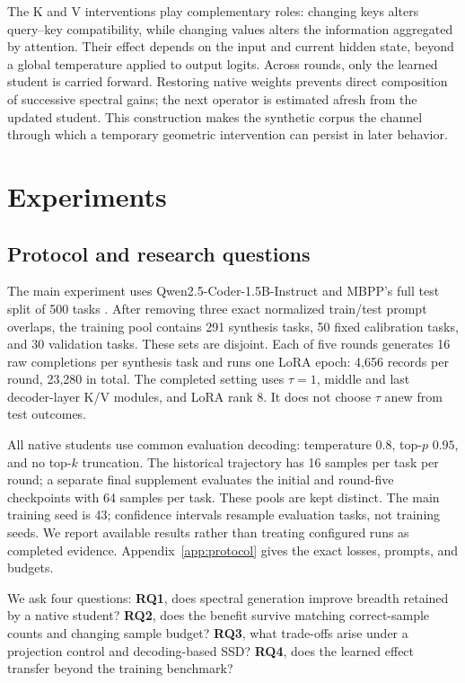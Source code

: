 \documentclass{article}
\begin{document}
The K and V interventions play complementary roles: changing keys alters query--key compatibility, while changing values alters the information aggregated by attention. Their effect depends on the input and current hidden state, beyond a global temperature applied to output logits. Across rounds, only the learned student is carried forward. Restoring native weights prevents direct composition of successive spectral gains; the next operator is estimated afresh from the updated student. This construction makes the synthetic corpus the channel through which a temporary geometric intervention can persist in later behavior.

\section{Experiments}
\label{sec:experiments}
\subsection{Protocol and research questions}
The main experiment uses Qwen2.5-Coder-1.5B-Instruct \citep{hui2024qwen25coder} and MBPP's full test split of 500 tasks \citep{austin2021mbpp}. After removing three exact normalized train/test prompt overlaps, the training pool contains 291 synthesis tasks, 50 fixed calibration tasks, and 30 validation tasks. These sets are disjoint. Each of five rounds generates 16 raw completions per synthesis task and runs one LoRA epoch: 4,656 records per round, 23,280 in total. The completed setting uses $\tau=1$, middle and last decoder-layer K/V modules, and LoRA rank 8. It does not choose $\tau$ anew from test outcomes.

All native students use common evaluation decoding: temperature $0.8$, top-$p$ $0.95$, and no top-$k$ truncation. The historical trajectory has 16 samples per task per round; a separate final supplement evaluates the initial and round-five checkpoints with 64 samples per task. These pools are kept distinct. The main training seed is 43; confidence intervals resample evaluation tasks, not training seeds. We report available results rather than treating configured runs as completed evidence. Appendix~\ref{app:protocol} gives the exact losses, prompts, and budgets.

We ask four questions: \textbf{RQ1}, does spectral generation improve breadth retained by a native student? \textbf{RQ2}, does the benefit survive matching correct-sample counts and changing sample budget? \textbf{RQ3}, what trade-offs arise under a projection control and decoding-based SSD? \textbf{RQ4}, does the learned effect transfer beyond the training benchmark?
\end{document}
